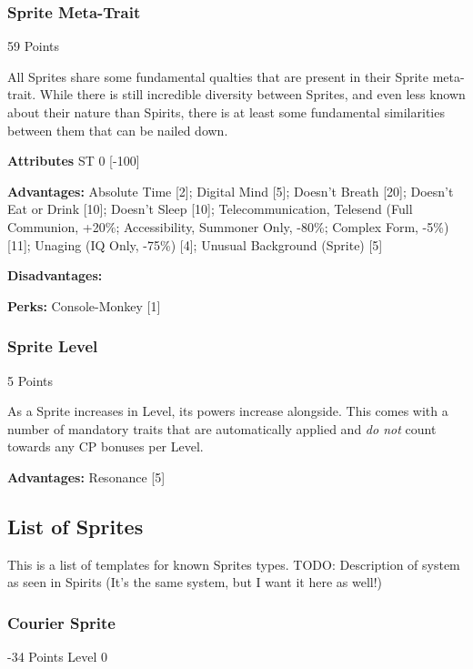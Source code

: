 \begin{multicols*}{3}
\subsubsection{Sprite Meta-Trait}
\begin{flushright}
	59 Points
\end{flushright}

All Sprites share some fundamental qualties that are present in their Sprite meta-trait. While there is still incredible diversity between Sprites, and even less known about their nature than Spirits, there is at least some fundamental similarities between them that can be nailed down.

\textbf{Attributes}
ST 0 [-100]

\textbf{Advantages:}
Absolute Time [2]; Digital Mind [5]; Doesn't Breath [20]; Doesn't Eat or Drink [10]; Doesn't Sleep [10]; Telecommunication, Telesend (Full Communion, +20\%; Accessibility, Summoner Only, -80\%; Complex Form, -5\%) [11]; Unaging (IQ Only, -75\%) [4]; Unusual Background (Sprite) [5]

\textbf{Disadvantages:}

\textbf{Perks:}
Console-Monkey [1]

\subsubsection{Sprite Level}\label{sprite_level}
\begin{flushright}
	5 Points
\end{flushright}

As a Sprite increases in Level, its powers increase alongside. This comes with a number of mandatory traits that are automatically applied and \textit{do not} count towards any CP bonuses per Level.

\textbf{Advantages:}
Resonance [5]

\subsection{List of Sprites}

This is a list of templates for known Sprites types. TODO: Description of system as seen in Spirits (It's the same system, but I want it here as well!)

\subsubsection{Courier Sprite}
\begin{flushright}
	 -34 Points Level 0
\end{flushright}


\end{multicols*}
